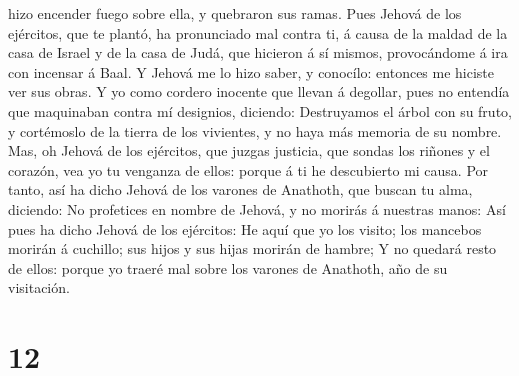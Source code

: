 hizo encender fuego sobre ella, y quebraron sus ramas. 
Pues Jehová de los ejércitos, que te plantó, ha pronunciado mal contra
ti, á causa de la maldad de la casa de Israel y de la casa de Judá, que
hicieron á sí mismos, provocándome á ira con incensar á Baal.
 Y Jehová me lo hizo saber, y conocílo: entonces me hiciste
ver sus obras.  Y yo como cordero inocente que llevan á
degollar, pues no entendía que maquinaban contra mí designios, diciendo:
Destruyamos el árbol con su fruto, y cortémoslo de la tierra de los
vivientes, y no haya más memoria de su nombre.  Mas, oh
Jehová de los ejércitos, que juzgas justicia, que sondas los riñones y
el corazón, vea yo tu venganza de ellos: porque á ti he descubierto mi
causa.  Por tanto, así ha dicho Jehová de los varones de
Anathoth, que buscan tu alma, diciendo: No profetices en nombre de
Jehová, y no morirás á nuestras manos:  Así pues ha dicho
Jehová de los ejércitos: He aquí que yo los visito; los mancebos morirán
á cuchillo; sus hijos y sus hijas morirán de hambre;  Y no
quedará resto de ellos: porque yo traeré mal sobre los varones de
Anathoth, año de su visitación.

\hypertarget{section-11}{%
\section{12}\label{section-11}}

